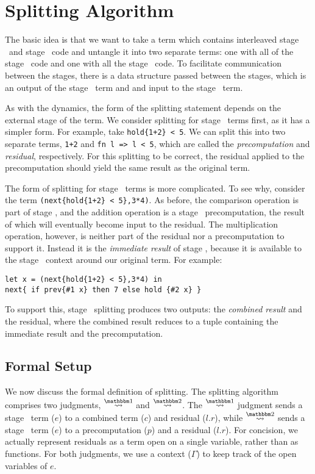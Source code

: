 
\section{Splitting Algorithm}

The basic idea is that we want to take a term which contains interleaved stage \bbone\ and stage \bbtwo\ code
and untangle it into two separate terms: one with all of the stage \bbone\ code and one with all the stage \bbtwo\ code.
To facilitate communication between the stages, there is a data structure passed between the stages, 
which is an output of the stage \bbone\ term and and input to the stage \bbtwo\ term.

As with the dynamics, the form of the splitting statement depends on the external stage of the term.
We consider splitting for stage \bbtwo\ terms first, as it has a simpler form.  
For example, take \verb|hold{1+2} < 5|.
We can split this into two separate terms, \verb|1+2| and \verb|fn l => l < 5|, 
which are called the {\em precomputation} and {\em residual}, respectively.  
For this splitting to be correct, the residual applied to the precomputation should yield the same result as the original term.  

The form of splitting for stage \bbone\ terms is more complicated.
To see why, consider the term \verb|(next{hold{1+2} < 5},3*4)|.
As before, the comparison operation is part of stage \bbtwo, 
and the addition operation is a stage \bbone\ precomputation, the result of which will eventually become input to the residual.
The multiplication operation, however, is neither part of the residual nor a precomputation to support it.
Instead it is the {\em immediate result} of stage \bbone, 
because it is available to the stage \bbone\ context around our original term.
For example:
\begin{lstlisting}
let x = (next{hold{1+2} < 5},3*4) in
next{ if prev{#1 x} then 7 else hold {#2 x} }
\end{lstlisting}
To support this, stage \bbone\ splitting produces two outputs: the {\em combined result} and the residual,
where the combined result reduces to a tuple containing the immediate result and the precomputation.

\subsection {Formal Setup}

We now discuss the formal definition of splitting.
The splitting algorithm comprises two judgments, $\splitonesym$ and $\splittwosym$.
The $\splitonesym$ judgment sends a stage \bbone\ term ($e$) to a combined term ($c$) and residual ($l.r$),
while $\splittwosym$ sends a stage \bbtwo\ term ($e$) to a precomputation ($p$) and a residual ($l.r$).
For concision, we actually represent residuals as a term open on a single variable, rather than as functions.
For both judgments, we use a context ($\Gamma$) to keep track of the open variables of $e$.

